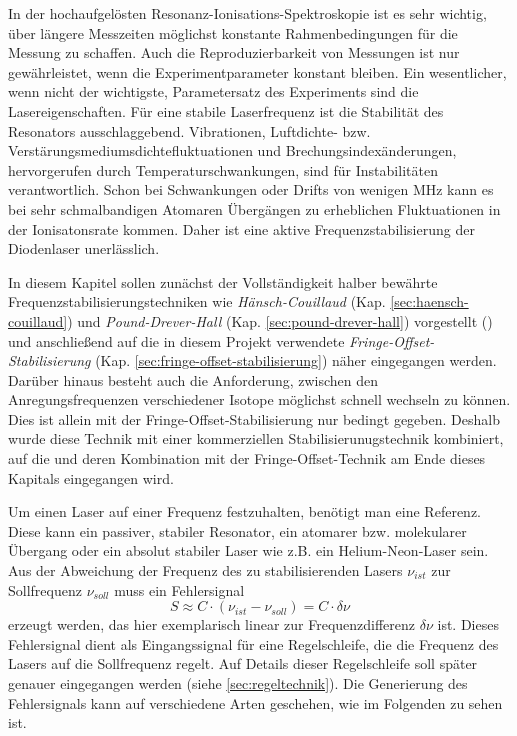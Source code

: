 In der hochaufgelösten Resonanz-Ionisations-Spektroskopie ist es
sehr wichtig, über längere Messzeiten möglichst konstante Rahmenbedingungen für die Messung zu
schaffen. Auch die Reproduzierbarkeit von Messungen ist nur gewährleistet, wenn
die Experimentparameter konstant bleiben. Ein wesentlicher, wenn nicht der
wichtigste, Parametersatz des Experiments sind die Lasereigenschaften. Für
eine stabile Laserfrequenz ist die Stabilität des Resonators ausschlaggebend.
Vibrationen, Luftdichte- bzw. Verstärungsmediumsdichtefluktuationen und
Brechungsindexänderungen, hervorgerufen durch Temperaturschwankungen, sind für
Instabilitäten verantwortlich. Schon bei Schwankungen oder Drifts von wenigen
MHz kann es bei sehr schmalbandigen Atomaren Übergängen zu erheblichen
Fluktuationen in der Ionisatonsrate kommen. Daher ist eine aktive
Frequenzstabilisierung der Diodenlaser unerlässlich.\par
In diesem Kapitel sollen zunächst der Vollständigkeit halber bewährte
Frequenzstabilisierungstechniken wie
\textit{Hänsch-Couillaud} (Kap.
\ref{sec:haensch-couillaud}) und \textit{Pound-Drever-Hall} (Kap.
\ref{sec:pound-drever-hall}) vorgestellt
(\cite{noertershaeuser:physik_des_lasers}) und anschließend auf die in diesem
Projekt verwendete \textit{Fringe-Offset-Stabilisierung} (Kap.
\ref{sec:fringe-offset-stabilisierung}) näher eingegangen werden. Darüber hinaus
besteht auch die Anforderung, zwischen den Anregungsfrequenzen verschiedener Isotope möglichst schnell wechseln zu können. Dies ist allein mit der Fringe-Offset-Stabilisierung nur bedingt gegeben. Deshalb wurde diese Technik mit einer kommerziellen Stabilisierunugstechnik kombiniert, auf die und deren Kombination mit der Fringe-Offset-Technik am Ende dieses Kapitals eingegangen wird.\par
Um einen Laser auf einer Frequenz festzuhalten, benötigt
man eine Referenz. Diese kann ein passiver, stabiler Resonator, ein atomarer
bzw. molekularer Übergang oder ein absolut stabiler Laser wie z.B. ein Helium-Neon-Laser sein.
Aus der Abweichung der Frequenz des zu stabilisierenden Lasers $\nu_{ist}$ zur
Sollfrequenz $\nu_{soll}$ muss ein Fehlersignal
\begin{equation}\label{eq:servoschleife_fehlersignal}
	S\approx C\cdot(\nu_{ist}-\nu_{soll})=C\cdot\delta\nu
\end{equation}
erzeugt werden, das hier exemplarisch linear zur Frequenzdifferenz $\delta\nu$
ist. Dieses Fehlersignal dient als Eingangssignal für eine Regelschleife, die
die Frequenz des Lasers auf die Sollfrequenz regelt. Auf Details dieser
Regelschleife soll später genauer eingegangen werden (siehe
\ref{sec:regeltechnik}). Die Generierung des Fehlersignals kann auf verschiedene Arten geschehen, wie im Folgenden zu sehen
ist.

